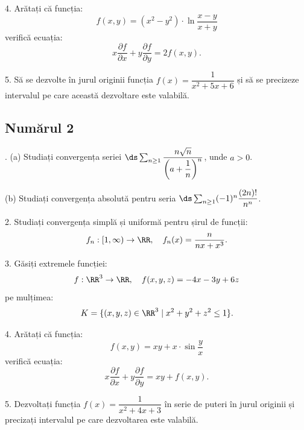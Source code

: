 \vspace{1cm}

4. Arătați că funcția:
\[
  f(x, y) = (x^2 - y^2) \cdot \ln \dfrac{x - y}{x + y}
\]
verifică ecuația:
\[
  x \dfrac{\partial f}{\partial x} + y \dfrac{\partial f}{\partial y} = 2f(x, y).
\]

\vspace{1cm}

5. Să se dezvolte în jurul originii funcția $ f(x) = \dfrac{1}{x^2 + 5x + 6} $
și să se precizeze intervalul pe care această dezvoltare este valabilă.

\subsection{Numărul 2}

\indent{}. (a) Studiați convergența seriei 
$ \ds\sum_{n \geq 1} \dfrac{n \sqrt{n}}{\left( a + \dfrac{1}{n} \right)^n} $,
unde $ a > 0 $.

(b) Studiați convergența absolută pentru seria $ \ds\sum_{n \geq 1} (-1)^n \dfrac{(2n)!}{n^n} $.

\vspace{1cm}

2. Studiați convergența simplă și uniformă pentru șirul de funcții:
\[
  f_n : [1, \infty) \to \RR, \quad f_n(x) = \dfrac{n}{nx + x^3}.
\]

\vspace{1cm}

3. Găsiți extremele funcției:
\[
  f: \RR^3 \to \RR, \quad f(x, y, z) = -4x - 3y + 6z
\]
pe mulțimea:
\[
  K = \{(x, y, z) \in \RR^3 \mid x^2 + y^2 + z^2 \leq 1 \}.
\]

\vspace{1cm}

4. Arătați că funcția:
\[
  f(x, y) = xy + x \cdot \sin\dfrac{y}{x}
\]
verifică ecuația:
\[
  x \dfrac{\partial f}{\partial x} + y \dfrac{\partial f}{\partial y} = xy + f(x, y).
\]

\vspace{1cm}

5. Dezvoltați funcția $ f(x) = \dfrac{1}{x^2 + 4x + 3} $ în serie de puteri în jurul
originii și precizați intervalul pe care dezvoltarea este valabilă.


